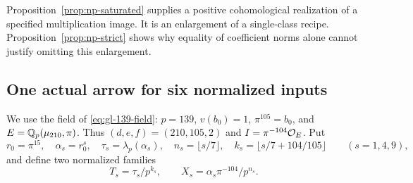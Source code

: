 Proposition~\ref{prop:np-saturated} supplies a positive cohomological
realization of a specified multiplication image. It is an enlargement
of a single-class recipe. Proposition~\ref{prop:np-strict} shows
why equality of coefficient norms alone cannot justify omitting
this enlargement.

\subsection{One actual arrow for six normalized inputs}

We use the field of \eqref{eq:gl-139-field}: $p=139$,
$v(b_0)=1$, $\pi^{105}=b_0$, and
$E=\mathbb Q_p(\mu_{210},\pi)$. Thus $(d,e,f)=(210,105,2)$ and
$I=\pi^{-104}\mathcal O_E$. Put
\[
 r_0=\pi^{15},\quad \alpha_s=r_0^s,\quad
 \tau_s=\lambda_p(\alpha_s),\quad
 n_s=\lfloor s/7\rfloor,\quad
 k_s=\lfloor s/7+104/105\rfloor
 \qquad(s=1,4,9),
\]
and define two normalized families
\begin{equation}\label{eq:np-six-vectors}
             T_s=\tau_s/p^{k_s},\qquad
             X_s=\alpha_s\pi^{-104}/p^{n_s}.
\end{equation}

